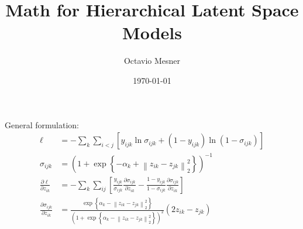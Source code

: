 \documentclass{article}
\title{Math for Hierarchical Latent Space Models}
\date{\today}
\author{Octavio Mesner}
\begin{document}
\maketitle

\newcommand\curly[1]{\left\{#1\right\}}
\newcommand\brac[1]{\left[#1\right]}
\newcommand\paren[1]{\left(#1\right)}
\newcommand\abs[1]{\left|#1\right|}
\newcommand\norm[1]{\left\|#1\right\|}
\newcommand\ang[1]{\left\langle#1\right\rangle}
\newcommand{\R}{\mathbb{R}}
\newcommand{\N}{\mathbb{N}}
\newcommand{\bone}{\mathbf{1}}
\newcommand{\calL}{\mathcal{L}}
\def\tr{\mathrm{tr}}

General formulation:
\begin{align*}
  \ell &= -\sum_k\sum_{i<j} \brac{y_{ijk} \ln \sigma_{ijk}
         + (1-y_{ijk})\ln (1-\sigma_{ijk})}\\
  \sigma_{ijk} &= \paren{1+\exp\curly{-\alpha_k + \norm{z_{ik} -
                 z_{jk}}_2^2}}^{-1}\\
  \frac{\partial \ell}{\partial z_{ik}}
       &= -\sum_k\sum_{ij}
         \brac{\frac{y_{ijk}}{\sigma_{ijk}}
         \frac{\partial\sigma_{ijk}}{\partial z_{ik}}
         - \frac{1-y_{ijk}}{1-\sigma_{ijk}}
         \frac{\partial\sigma_{ijk}}{\partial z_{ik}}}\\
  \frac{\partial \sigma_{ijk}}{\partial z_{ik}}
       &= \frac{\exp\curly{\alpha_k-\norm{z_{ik}-z_{jk}}_2^2}}
         {\paren{1+\exp\curly{\alpha_k - \norm{z_{ik} -
         z_{jk}}_2^2}}^2}
         \paren{2z_{ik} - z_{jk}}
\end{align*}
\end{document}
